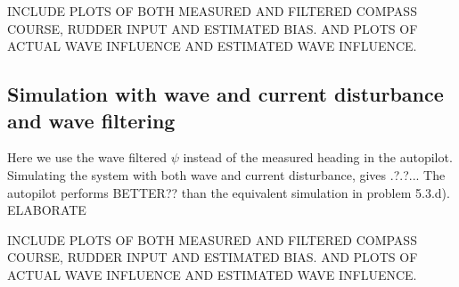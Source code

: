 INCLUDE PLOTS OF BOTH MEASURED AND FILTERED COMPASS COURSE, RUDDER INPUT AND ESTIMATED BIAS. AND PLOTS OF ACTUAL WAVE INFLUENCE AND ESTIMATED WAVE INFLUENCE.

\subsection{Simulation with wave and current disturbance and wave filtering}
Here we use the wave filtered $\psi$ instead of the measured heading in the autopilot. Simulating the system with both wave and current disturbance, gives .?.?... The autopilot performs BETTER?? than the equivalent simulation in problem 5.3.d). ELABORATE
\newline

INCLUDE PLOTS OF BOTH MEASURED AND FILTERED COMPASS COURSE, RUDDER INPUT AND ESTIMATED BIAS. AND PLOTS OF ACTUAL WAVE INFLUENCE AND ESTIMATED WAVE INFLUENCE.